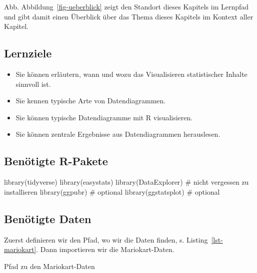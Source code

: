 \documentclass[
  letterpaper,
]{scrbook}
\newenvironment{Shaded}{\begin{snugshade}}{\end{snugshade}}
\newcommand{\CommentTok}[1]{\textcolor[rgb]{0.37,0.37,0.37}{#1}}
\newcommand{\FunctionTok}[1]{\textcolor[rgb]{0.28,0.35,0.67}{#1}}
\newcommand{\NormalTok}[1]{\textcolor[rgb]{0.00,0.23,0.31}{#1}}
\newcommand{\OtherTok}[1]{\textcolor[rgb]{0.00,0.23,0.31}{#1}}
\newcommand{\StringTok}[1]{\textcolor[rgb]{0.13,0.47,0.30}{#1}}
\providecommand{\tightlist}{%
  \setlength{\itemsep}{0pt}\setlength{\parskip}{0pt}}\usepackage{longtable,booktabs,array}
\theoremstyle{definition}
\theoremstyle{definition}
\theoremstyle{definition}
\theoremstyle{remark}
\begin{document}
Abb. Abbildung~\ref{fig-ueberblick} zeigt den Standort dieses Kapitels
im Lernpfad und gibt damit einen Überblick über das Thema dieses
Kapitels im Kontext aller Kapitel.

\subsection{Lernziele}\label{lernziele-4}

\begin{itemize}
\tightlist
\item
  Sie können erläutern, wann und wozu das Visualisieren statistischer
  Inhalte sinnvoll ist.
\item
  Sie kennen typische Arte von Datendiagrammen.
\item
  Sie können typische Datendiagramme mit R visualisieren.
\item
  Sie können zentrale Ergebnisse aus Datendiagrammen herauslesen.
\end{itemize}

\subsection{Benötigte R-Pakete}\label{benuxf6tigte-r-pakete-1}

\begin{Shaded}
\begin{Highlighting}[]
\FunctionTok{library}\NormalTok{(tidyverse)}
\FunctionTok{library}\NormalTok{(easystats)}
\FunctionTok{library}\NormalTok{(DataExplorer)  }\CommentTok{\# nicht vergessen zu installieren}
\FunctionTok{library}\NormalTok{(ggpubr)  }\CommentTok{\# optional}
\FunctionTok{library}\NormalTok{(ggstatsplot)  }\CommentTok{\# optional}
\end{Highlighting}
\end{Shaded}

\subsection{Benötigte Daten}\label{benuxf6tigte-daten-2}

Zuerst definieren wir den Pfad, wo wir die Daten finden, s.
Listing~\ref{lst-mariokart}. Dann importieren wir die Mariokart-Daten.

\begin{codelisting}

\caption{\label{lst-mariokart}Pfad zu den Mariokart-Daten}

\centering{

\begin{Shaded}
\begin{Highlighting}[]
\NormalTok{mariokart\_path }\OtherTok{\textless{}{-}} \FunctionTok{paste0}\NormalTok{(}
  \StringTok{"https://vincentarelbundock.github.io/Rdatasets"}\NormalTok{,}
  \StringTok{"/csv/openintro/mariokart.csv"}\NormalTok{)}

\NormalTok{mariokart }\OtherTok{\textless{}{-}} \FunctionTok{read.csv}\NormalTok{(mariokart\_path)}
\end{Highlighting}
\end{Shaded}

}

\end{codelisting}%
\end{document}
